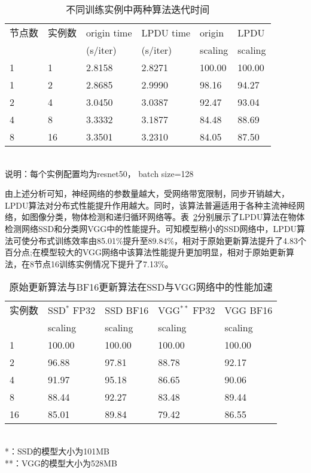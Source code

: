 \begin{table}[htbp]
  \centering
  \caption{不同训练实例中两种算法迭代时间}
  \label{tab:fp32_bf16_real_iter_time}
  \begin{minipage}[t]{0.9\textwidth} 
    \begin{tabularx}{\linewidth}{|l|X|X|X|X|X|}
      \hline
      节点数 & 实例数 & origin time & LPDU time & origin & LPDU \\
       &  & (s/iter) & (s/iter) & scaling & scaling\\
      \hline
1 & 1 & 2.8158 & 2.8271 & 100.00 & 100.00 \\
1 & 2 & 2.8685 & 2.9990 & 98.16 & 94.27 \\
2 & 4 & 3.0450 & 3.0387 & 92.47 & 93.04 \\
4 & 8 & 3.3332 & 3.1877 & 84.48 & 88.69 \\
8 & 16 & 3.3501 & 3.2310 & 84.05 & 87.50 \\
      \hline
    \end{tabularx}\\[2pt]
    \footnotesize
    说明：每个实例配置均为resnet50， batch size=128\\
  \end{minipage}
\end{table}

由上述分析可知，神经网络的参数量越大，受网络带宽限制，同步开销越大，LPDU算法对分布式性能提升作用越大。同时，该算法普遍适用于各种主流神经网络，如图像分类，物体检测和递归循环网络等。表~\ref{tab:ssd_vgg_scaling}分别展示了LPDU算法在物体检测网络SSD和分类网VGG中的性能提升。可知模型稍小的SSD网络中，LPDU算法可使分布式训练效率由85.01\%提升至89.84\%，相对于原始更新算法提升了4.83个百分点;在模型较大的VGG网络中该算法性能提升更加明显，相对于原始更新算法，在8节点16训练实例情况下提升了7.13\%。
\begin{table}[htbp]
  \centering
  \caption{原始更新算法与BF16更新算法在SSD与VGG网络中的性能加速}
  \label{tab:ssd_vgg_scaling}
  \begin{minipage}[t]{0.8\textwidth} 
    \begin{tabularx}{\linewidth}{|l|X|X|X|X|}
      \hline
      实例数 & SSD$^{*}$ FP32 & SSD BF16 & VGG$^{**}$ FP32 & VGG BF16 \\
       & scaling & scaling & scaling & scaling\\
      \hline
1 & 100.00 & 100.00 & 100.00 & 100.00 \\
2 & 96.88 & 97.81 & 88.78 & 92.17 \\
4 & 91.97 & 95.18 & 86.65 & 90.06 \\
8 & 88.44 & 92.27 & 83.48 & 89.44 \\
16 & 85.01 & 89.84 & 79.42 & 86.55 \\
      \hline
    \end{tabularx}\\[2pt]
    \footnotesize
    *：SSD的模型大小为101MB\\
    **：VGG的模型大小为528MB
  \end{minipage}
\end{table}

